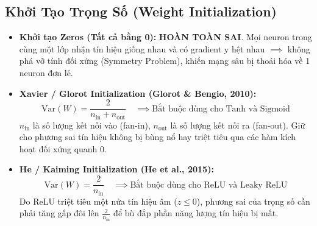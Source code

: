 \documentclass[10pt,a4paper]{article}
\begin{document}
\subsection{Khởi Tạo Trọng Số (Weight Initialization)}
\begin{itemize}[leftmargin=*]
    \item \textbf{Khởi tạo Zeros (Tất cả bằng 0):} \textbf{HOÀN TOÀN SAI}. Mọi neuron trong cùng một lớp nhận tín hiệu giống nhau và có gradient y hệt nhau $\implies$ không phá vỡ tính đối xứng (Symmetry Problem), khiến mạng sâu bị thoái hóa về 1 neuron đơn lẻ.
    \item \textbf{Xavier / Glorot Initialization (Glorot \& Bengio, 2010):}
    \begin{equation}
        \text{Var}(W) = \frac{2}{n_{\text{in}} + n_{\text{out}}} \quad \implies \text{Bắt buộc dùng cho Tanh và Sigmoid}
    \end{equation}
    $n_{\text{in}}$ là số lượng kết nối vào (fan-in), $n_{\text{out}}$ là số lượng kết nối ra (fan-out). Giữ cho phương sai tín hiệu không bị bùng nổ hay triệt tiêu qua các hàm kích hoạt đối xứng quanh 0.
    \item \textbf{He / Kaiming Initialization (He et al., 2015):}
    \begin{equation}
        \text{Var}(W) = \frac{2}{n_{\text{in}}} \quad \implies \text{Bắt buộc dùng cho ReLU và Leaky ReLU}
    \end{equation}
    Do ReLU triệt tiêu một nửa tín hiệu âm ($z \le 0$), phương sai của trọng số cần phải tăng gấp đôi lên $\frac{2}{n_{\text{in}}}$ để bù đắp phần năng lượng tín hiệu bị mất.
\end{itemize}
\end{document}
